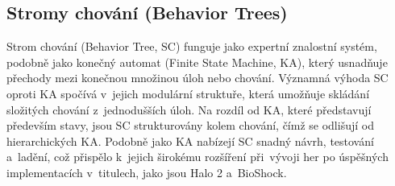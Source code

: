 \newpage

\subsection{Stromy chování (Behavior Trees)}
Strom chování (Behavior Tree, SC)\cite{Colledanchise2018} funguje jako expertní znalostní systém, podobně jako konečný automat (Finite State Machine, KA), který usnadňuje přechody mezi konečnou množinou úloh nebo chování. Významná výhoda SC oproti KA spočívá v~jejich modulární struktuře, která umožňuje skládání složitých chování z~jednodušších úloh. Na rozdíl od KA, které představují především stavy, jsou SC strukturovány kolem chování, čímž se odlišují od hierarchických KA. Podobně jako KA nabízejí SC snadný návrh, testování a~ladění, což přispělo k~jejich širokému rozšíření při~vývoji her po úspěšných implementacích v~titulech, jako jsou Halo 2\cite{Isla2005} a~BioShock.

